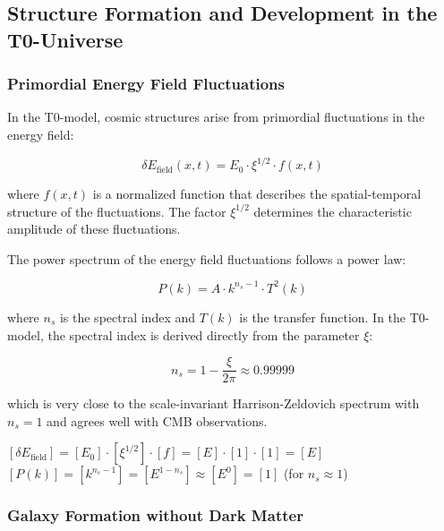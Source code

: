 \documentclass[12pt,a4paper]{article}
\theoremstyle{definition}
\begin{document}
	\subsection{Structure Formation and Development in the T0-Universe}
	
	\subsubsection{Primordial Energy Field Fluctuations}
	
	In the T0-model, cosmic structures arise from primordial fluctuations in the energy field:
	
	\begin{equation}
		\delta E_{\text{field}}(x,t) = E_0 \cdot \xi^{1/2} \cdot f(x,t)
	\end{equation}
	
	where $f(x,t)$ is a normalized function that describes the spatial-temporal structure of the fluctuations. The factor $\xi^{1/2}$ determines the characteristic amplitude of these fluctuations.
	
	The power spectrum of the energy field fluctuations follows a power law:
	
	\begin{equation}
		P(k) = A \cdot k^{n_s - 1} \cdot T^2(k)
	\end{equation}
	
	where $n_s$ is the spectral index and $T(k)$ is the transfer function. In the T0-model, the spectral index is derived directly from the parameter $\xi$:
	
	\begin{equation}
		n_s = 1 - \frac{\xi}{2\pi} \approx 0.99999
	\end{equation}
	
	which is very close to the scale-invariant Harrison-Zeldovich spectrum with $n_s = 1$ and agrees well with CMB observations.
	
	\begin{einheitencheck}
		$[\delta E_{\text{field}}] = [E_0] \cdot [\xi^{1/2}] \cdot [f] = [E] \cdot [1] \cdot [1] = [E]$ \checkmark\\
		$[P(k)] = [k^{n_s-1}] = [E^{1-n_s}] \approx [E^{0}] = [1]$ (for $n_s \approx 1$) \checkmark
	\end{einheitencheck}
	
	\subsubsection{Galaxy Formation without Dark Matter}
	
\end{document}
